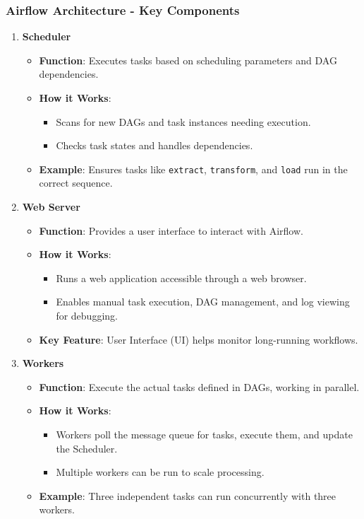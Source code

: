 \documentclass[aspectratio=169]{beamer}
\begin{document}
\begin{frame}[fragile]
    \frametitle{Airflow Architecture - Key Components}
    \begin{enumerate}
        \item \textbf{Scheduler}
        \begin{itemize}
            \item \textbf{Function}: Executes tasks based on scheduling parameters and DAG dependencies.
            \item \textbf{How it Works}:
                \begin{itemize}
                    \item Scans for new DAGs and task instances needing execution.
                    \item Checks task states and handles dependencies.
                \end{itemize}
            \item \textbf{Example}: Ensures tasks like \texttt{extract}, \texttt{transform}, and \texttt{load} run in the correct sequence.
        \end{itemize}
        
        \item \textbf{Web Server}
        \begin{itemize}
            \item \textbf{Function}: Provides a user interface to interact with Airflow.
            \item \textbf{How it Works}:
                \begin{itemize}
                    \item Runs a web application accessible through a web browser.
                    \item Enables manual task execution, DAG management, and log viewing for debugging.
                \end{itemize}
            \item \textbf{Key Feature}: User Interface (UI) helps monitor long-running workflows.
        \end{itemize}

        \item \textbf{Workers}
        \begin{itemize}
            \item \textbf{Function}: Execute the actual tasks defined in DAGs, working in parallel.
            \item \textbf{How it Works}:
                \begin{itemize}
                    \item Workers poll the message queue for tasks, execute them, and update the Scheduler.
                    \item Multiple workers can be run to scale processing.
                \end{itemize}
            \item \textbf{Example}: Three independent tasks can run concurrently with three workers.
        \end{itemize}
    \end{enumerate}
\end{frame}
\end{document}
